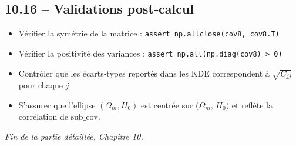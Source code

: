 \subsection{10.16 – Validations post‐calcul}
\begin{itemize}
  \item Vérifier la symétrie de la matrice :  
    \verb|assert np.allclose(cov8, cov8.T)|  
  \item Vérifier la positivité des variances :  
    \verb|assert np.all(np.diag(cov8) > 0)|  
  \item Contrôler que les écarts‐types reportés dans les KDE correspondent 
        à \(\sqrt{C_{jj}}\) pour chaque \(j\).  
  \item S’assurer que l’ellipse \((\Omega_{m},H_{0})\) est centrée sur 
        \(\bigl(\overline{\Omega}_{m},\,\overline{H}_{0}\bigr)\) 
        et reflète la corrélation de \(\text{sub_cov}\).
\end{itemize}

\bigskip
\noindent\emph{Fin de la partie détaillée, Chapitre 10.}